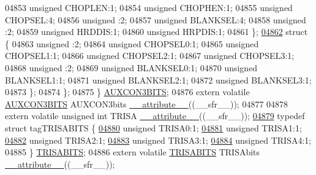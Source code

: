 \begin{DoxyCode}
04853       \textcolor{keywordtype}{unsigned} CHOPLEN:1;
04854       \textcolor{keywordtype}{unsigned} CHOPHEN:1;
04855       \textcolor{keywordtype}{unsigned} CHOPSEL:4;
04856       \textcolor{keywordtype}{unsigned} :2;
04857       \textcolor{keywordtype}{unsigned} BLANKSEL:4;
04858       \textcolor{keywordtype}{unsigned} :2;
04859       \textcolor{keywordtype}{unsigned} HRDDIS:1;
04860       \textcolor{keywordtype}{unsigned} HRPDIS:1;
04861     \};
\hypertarget{a00015_source_l04862}{}\hyperlink{a00015}{04862}     \textcolor{keyword}{struct }\{
04863       \textcolor{keywordtype}{unsigned} :2;
04864       \textcolor{keywordtype}{unsigned} CHOPSEL0:1;
04865       \textcolor{keywordtype}{unsigned} CHOPSEL1:1;
04866       \textcolor{keywordtype}{unsigned} CHOPSEL2:1;
04867       \textcolor{keywordtype}{unsigned} CHOPSEL3:1;
04868       \textcolor{keywordtype}{unsigned} :2;
04869       \textcolor{keywordtype}{unsigned} BLANKSEL0:1;
04870       \textcolor{keywordtype}{unsigned} BLANKSEL1:1;
04871       \textcolor{keywordtype}{unsigned} BLANKSEL2:1;
04872       \textcolor{keywordtype}{unsigned} BLANKSEL3:1;
04873     \};
04874   \};
04875 \} \hyperlink{a00014_d8/dfa/a00121}{AUXCON3BITS};
04876 \textcolor{keyword}{extern} \textcolor{keyword}{volatile} \hyperlink{a00014_d8/dfa/a00121}{AUXCON3BITS} AUXCON3bits \hyperlink{a00015_a493c46f03454991ccc5aa7a6e1dfb2a7}{\_\_attribute\_\_}((\_\_sfr\_\_));
04877 
04878 \textcolor{keyword}{extern} \textcolor{keyword}{volatile} \textcolor{keywordtype}{unsigned} \textcolor{keywordtype}{int}  TRISA \hyperlink{a00015_a493c46f03454991ccc5aa7a6e1dfb2a7}{\_\_attribute\_\_}((\_\_sfr\_\_));
\hypertarget{a00015_source_l04879}{}\hyperlink{a00014}{04879} \textcolor{keyword}{typedef} \textcolor{keyword}{struct }tagTRISABITS \{
\hypertarget{a00015_source_l04880}{}\hyperlink{a00014_a5b058659efa978bacb96a404cfdbe610}{04880}   \textcolor{keywordtype}{unsigned} TRISA0:1;
\hypertarget{a00015_source_l04881}{}\hyperlink{a00014_ab129bf45a7e3be70a0acfea93d291273}{04881}   \textcolor{keywordtype}{unsigned} TRISA1:1;
\hypertarget{a00015_source_l04882}{}\hyperlink{a00014_af6281130cf7baba87c8550bd35d9d76d}{04882}   \textcolor{keywordtype}{unsigned} TRISA2:1;
\hypertarget{a00015_source_l04883}{}\hyperlink{a00014_a1a2488028e463b824d503f740b999146}{04883}   \textcolor{keywordtype}{unsigned} TRISA3:1;
\hypertarget{a00015_source_l04884}{}\hyperlink{a00014_a9f5eacb9cb6d29d89451ce640a6057ae}{04884}   \textcolor{keywordtype}{unsigned} TRISA4:1;
04885 \} \hyperlink{a00014_dc/d6e/a00833}{TRISABITS};
04886 \textcolor{keyword}{extern} \textcolor{keyword}{volatile} \hyperlink{a00014_dc/d6e/a00833}{TRISABITS} TRISAbits \hyperlink{a00015_a493c46f03454991ccc5aa7a6e1dfb2a7}{\_\_attribute\_\_}((\_\_sfr\_\_));

\end{DoxyCode}
